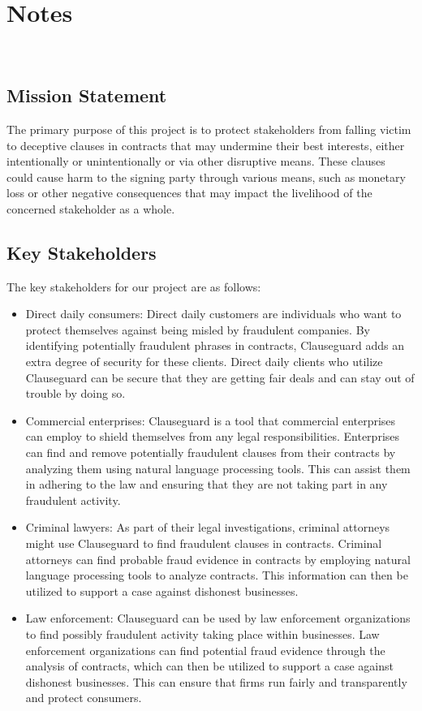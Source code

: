 \chapter{Notes 
\label{Chapter::Notes}}\
\section{Mission Statement \label{Section::Mission Statement} }
The primary purpose of this project is to protect stakeholders from falling victim to deceptive clauses in contracts that may undermine their best interests, either intentionally or unintentionally or via other disruptive means. These clauses could cause harm to the signing party through various means, such as monetary loss or other negative consequences that may impact the livelihood of the concerned stakeholder as a whole. 

\section{Key Stakeholders \label{Section::Key Stakeholders} }
The key stakeholders for our project are as follows: 
\begin{itemize}
    \item Direct daily consumers: Direct daily customers are individuals who want to protect themselves against being misled by fraudulent companies. By identifying potentially fraudulent phrases in contracts, Clauseguard adds an extra degree of security for these clients. Direct daily clients who utilize Clauseguard can be secure that they are getting fair deals and can stay out of trouble by doing so.
    \item Commercial enterprises: Clauseguard is a tool that commercial enterprises can employ to shield themselves from any legal responsibilities. Enterprises can find and remove potentially fraudulent clauses from their contracts by analyzing them using natural language processing tools. This can assist them in adhering to the law and ensuring that they are not taking part in any fraudulent activity.
    \item Criminal lawyers: As part of their legal investigations, criminal attorneys might use Clauseguard to find fraudulent clauses in contracts. Criminal attorneys can find probable fraud evidence in contracts by employing natural language processing tools to analyze contracts. This information can then be utilized to support a case against dishonest businesses.
    \item Law enforcement: Clauseguard can be used by law enforcement organizations to find possibly fraudulent activity taking place within businesses. Law enforcement organizations can find potential fraud evidence through the analysis of contracts, which can then be utilized to support a case against dishonest businesses. This can ensure that firms run fairly and transparently and protect consumers.
\end{itemize}




